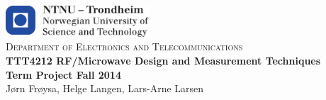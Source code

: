 \begin{titlepage}

	\begin{center}~
		\\[5cm]

		\includegraphics[width=0.4\textwidth]{./img/logontnu}~
		\\[0.3cm]
		\textsc{ Department of Electronics and Telecommunications}~
		\\[2cm]

		{ \huge \bfseries TTT4212 RF/Microwave Design and Measurement Techniques \\[0.5cm]
		Term Project Fall 2014 }~
		\\[1.5cm]
		

		{ \LARGE J\o rn Fr\o ysa, Helge Langen, Lars-Arne Larsen}
	\end{center}


\end{titlepage}
